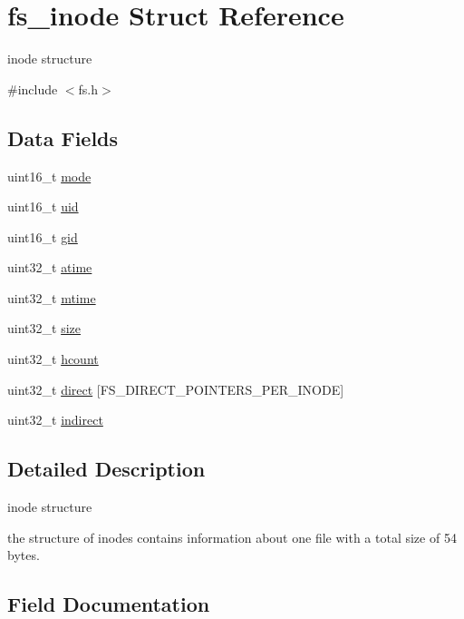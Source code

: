 \hypertarget{structfs__inode}{}\section{fs\+\_\+inode Struct Reference}
\label{structfs__inode}


inode structure  




{\ttfamily \#include $<$fs.\+h$>$}

\subsection*{Data Fields}
\begin{DoxyCompactItemize}
\item 
uint16\+\_\+t \mbox{\hyperlink{structfs__inode_a04b2f2016a6abba84872c15d6554c6b1}{mode}}
\item 
uint16\+\_\+t \mbox{\hyperlink{structfs__inode_ada0d9d68adb122d7e83558a1b8f683ec}{uid}}
\item 
uint16\+\_\+t \mbox{\hyperlink{structfs__inode_a93b1c3bdde3437a4dbfe538ffe47dc01}{gid}}
\item 
uint32\+\_\+t \mbox{\hyperlink{structfs__inode_a3c7fa94aa9d0d94355efb5fd53613a64}{atime}}
\item 
uint32\+\_\+t \mbox{\hyperlink{structfs__inode_ab11566bfc13bcd9f7cf24121447b0cfd}{mtime}}
\item 
uint32\+\_\+t \mbox{\hyperlink{structfs__inode_ac10de2ad4b7c87da65fc17b5674b5759}{size}}
\item 
uint32\+\_\+t \mbox{\hyperlink{structfs__inode_a0057adf5604e607679e68a94ab3e5cd9}{hcount}}
\item 
uint32\+\_\+t \mbox{\hyperlink{structfs__inode_a2d0c4627d2c8925e6a51502fa47685aa}{direct}} \mbox{[}F\+S\+\_\+\+D\+I\+R\+E\+C\+T\+\_\+\+P\+O\+I\+N\+T\+E\+R\+S\+\_\+\+P\+E\+R\+\_\+\+I\+N\+O\+DE\mbox{]}
\item 
uint32\+\_\+t \mbox{\hyperlink{structfs__inode_a5cde1770f044b6566f36f6acdf958beb}{indirect}}
\end{DoxyCompactItemize}


\subsection{Detailed Description}
inode structure 

the structure of inodes contains information about one file with a total size of 54 bytes. 

\subsection{Field Documentation}
\mbox{\label{structfs__inode_a3c7fa94aa9d0d94355efb5fd53613a64}} 
